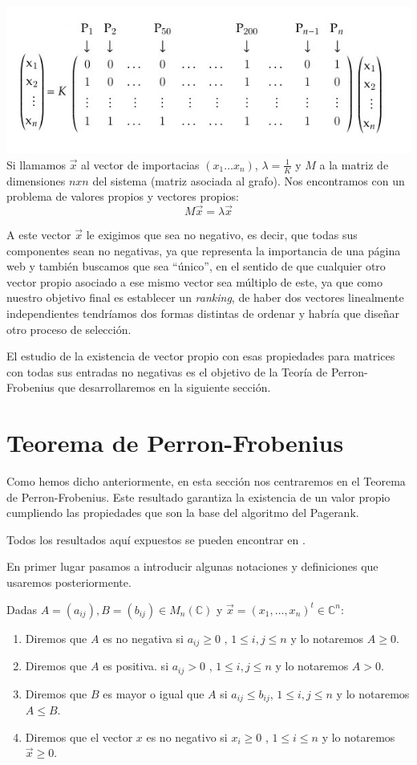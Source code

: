 \documentclass[size=a4, parskip=half, titlepage=false, toc=flat, toc=bib, 12pt]{scrartcl}
\theoremstyle{theorem-style}
\theoremstyle{definition-style}
\theoremstyle{remark-style}
\theoremstyle{example-style}
\theoremstyle{definition-style}
\theoremstyle{remark-style}
\begin{document}
\includegraphics[width=1.0\textwidth]{./img/matrizejemplo}
Si llamamos $\vec{x}$ al vector de importacias $(x_1 \dots x_n)$, $\lambda = \frac{1}{K}$ y
$M$ a la matriz de dimensiones $n x n$ del sistema (matriz asociada al grafo). Nos encontramos
con un problema de valores propios y vectores propios:
$$M \vec{x} = \lambda \vec{x} $$

A este vector $\vec{x}$ le exigimos que sea no negativo, es decir, que todas sus componentes sean no negativas, ya que representa la importancia de una página web y también buscamos que sea ``único'', en el sentido de que cualquier otro vector propio asociado a ese mismo vector sea múltiplo de este, ya que como nuestro objetivo final es establecer un \textit{ranking}, de haber dos vectores linealmente independientes tendríamos dos formas distintas de ordenar y habría que diseñar otro proceso de selección.

El estudio de la existencia de vector propio con esas propiedades para matrices con todas sus entradas no negativas es el objetivo de la Teoría de Perron-Frobenius que desarrollaremos en la siguiente sección.

\newpage

\section{Teorema de Perron-Frobenius}

Como hemos dicho anteriormente, en esta sección nos centraremos en el Teorema de Perron-Frobenius. Este resultado garantiza la existencia de un valor propio cumpliendo las propiedades que son la base del algoritmo del Pagerank.

Todos los resultados aquí expuestos se pueden encontrar en \cite{algebralineal}.

En primer lugar pasamos a introducir algunas notaciones y definiciones que usaremos posteriormente.

Dadas $A = (a_{ij}),B = (b_{ij}) \in M_n(\mathbb{C})$ y $\vec{x} = (x_1, \dots, x_n)^t\in \mathbb{C}^n$:
\begin{enumerate}
\item Diremos que $A$ es no negativa si $a_{ij}\geq 0$ , $1 \leq i,j \leq n$ y lo notaremos
$A\geq 0$.
\item Diremos que $A$ es positiva. si $a_{ij} > 0$ , $1 \leq i, j \leq n$ y lo notaremos $A > 0$.
\item Diremos que $B$ es mayor o igual que $A$ si $a_{ij} \leq b_{ij}$, $1 \leq i,j \leq n$ y lo notaremos $A \leq B$.
\item Diremos que el vector $x$ es no negativo si $x_i \geq 0$ , $1 \leq i \leq n$ y lo notaremos $\vec{x} \geq 0$.
\end{enumerate}
\end{document}
